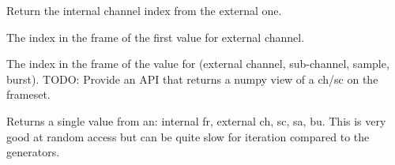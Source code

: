 \documentclass[letterpaper,10pt,english]{sphinxmanual}
\begin{document}
\begin{fulllineitems}
\begin{fulllineitems}
\end{fulllineitems}


\begin{fulllineitems}
\label{\detokenize{ref/LIS/core/FrameSet:TotalDepth.LIS.core.FrameSet.FrameSet.internalChIdx}}
Return the internal channel index from the external one.

\end{fulllineitems}


\begin{fulllineitems}
\label{\detokenize{ref/LIS/core/FrameSet:TotalDepth.LIS.core.FrameSet.FrameSet.valueIdxStartExtCh}}
The index in the frame of the first value for external channel.

\end{fulllineitems}


\begin{fulllineitems}
\label{\detokenize{ref/LIS/core/FrameSet:TotalDepth.LIS.core.FrameSet.FrameSet.valueIdxInFrame}}
The index in the frame of the value for (external channel, sub-channel, sample, burst).
TODO: Provide an API that returns a numpy view of a ch/sc on the frameset.

\end{fulllineitems}


\begin{fulllineitems}
\label{\detokenize{ref/LIS/core/FrameSet:TotalDepth.LIS.core.FrameSet.FrameSet.value}}
Returns a single value from an: internal fr, external ch, sc, sa, bu.
This is very good at random access but can be quite slow for iteration
compared to the generators.

\end{fulllineitems}



\end{fulllineitems}
\end{document}
